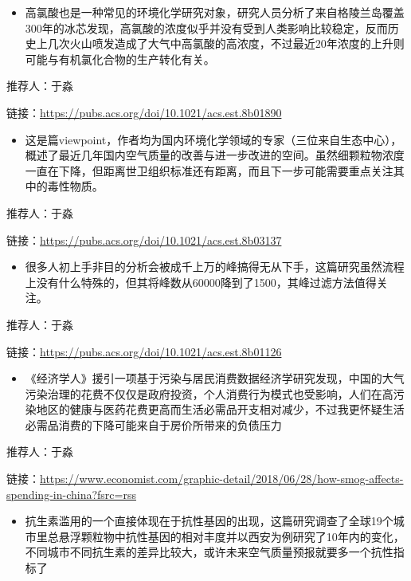 \documentclass[
]{book}
\providecommand{\tightlist}{%
  \setlength{\itemsep}{0pt}\setlength{\parskip}{0pt}}
\begin{document}
\begin{itemize}
\tightlist
\item
  高氯酸也是一种常见的环境化学研究对象，研究人员分析了来自格陵兰岛覆盖300年的冰芯发现，高氯酸的浓度似乎并没有受到人类影响比较稳定，反而历史上几次火山喷发造成了大气中高氯酸的高浓度，不过最近20年浓度的上升则可能与有机氯化合物的生产转化有关。
\end{itemize}

推荐人：于淼

链接：\url{https://pubs.acs.org/doi/10.1021/acs.est.8b01890}

\begin{itemize}
\tightlist
\item
  这是篇viewpoint，作者均为国内环境化学领域的专家（三位来自生态中心），概述了最近几年国内空气质量的改善与进一步改进的空间。虽然细颗粒物浓度一直在下降，但距离世卫组织标准还有距离，而且下一步可能需要重点关注其中的毒性物质。
\end{itemize}

推荐人：于淼

链接：\url{https://pubs.acs.org/doi/10.1021/acs.est.8b03137}

\begin{itemize}
\tightlist
\item
  很多人初上手非目的分析会被成千上万的峰搞得无从下手，这篇研究虽然流程上没有什么特殊的，但其将峰数从60000降到了1500，其峰过滤方法值得关注。
\end{itemize}

推荐人：于淼

链接：\url{https://pubs.acs.org/doi/10.1021/acs.est.8b01126}

\begin{itemize}
\tightlist
\item
  《经济学人》援引一项基于污染与居民消费数据经济学研究发现，中国的大气污染治理的花费不仅仅是政府投资，个人消费行为模式也受影响，人们在高污染地区的健康与医药花费更高而生活必需品开支相对减少，不过我更怀疑生活必需品消费的下降可能来自于房价所带来的负债压力
\end{itemize}

推荐人：于淼

链接：\url{https://www.economist.com/graphic-detail/2018/06/28/how-smog-affects-spending-in-china?fsrc=rss}

\begin{itemize}
\tightlist
\item
  抗生素滥用的一个直接体现在于抗性基因的出现，这篇研究调查了全球19个城市里总悬浮颗粒物中抗性基因的相对丰度并以西安为例研究了10年内的变化，不同城市不同抗生素的差异比较大，或许未来空气质量预报就要多一个抗性指标了
\end{itemize}
\end{document}
